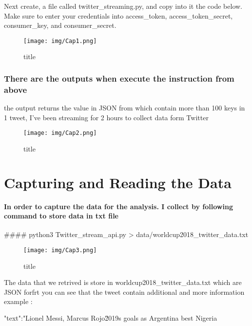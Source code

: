 \documentclass[11pt]{article}
\makeatletter
\def\maxwidth{\ifdim\Gin@nat@width>\linewidth\linewidth
    \else\Gin@nat@width\fi}
\let\Oldincludegraphics\includegraphics
\renewcommand{\includegraphics}[1]{\Oldincludegraphics[width=.8\maxwidth]{#1}}
\makeatother
\begin{document}
Next create, a file called twitter\_streaming.py, and copy into it the
code below. Make sure to enter your credentials into access\_token,
access\_token\_secret, consumer\_key, and consumer\_secret.

    \begin{figure}
\centering
\texttt{[image: img/Cap1.png]}
\caption{title}
\end{figure}

    \subsubsection{There are the outputs when execute the instruction from
above}\label{there-are-the-outputs-when-execute-the-instruction-from-above}

the output returns the value in JSON from which contain more than 100
keys in 1 tweet, I've been streaming for 2 hours to collect data form
Twitter

    \begin{figure}
\centering
\texttt{[image: img/Cap2.png]}
\caption{title}
\end{figure}

    \section{Capturing and Reading the
Data}\label{capturing-and-reading-the-data}

    \paragraph{In order to capture the data for the analysis. I collect by
following command to store data in txt
file}\label{in-order-to-capture-the-data-for-the-analysis.-i-collect-by-following-command-to-store-data-in-txt-file}

    \#\#\#\# {python3} Twitter\_stream\_api.py \textgreater{}
data/worldcup2018\_twitter\_data.txt

    \begin{figure}
\centering
\texttt{[image: img/Cap3.png]}
\caption{title}
\end{figure}

    The data that we retrived is store in worldcup2018\_twitter\_data.txt
which are JSON forfrt you can see that the tweet contain additional and
more information example :

{"text"}:"Lionel Messi, Marcus Rojo\u2019s goals as Argentina best
Nigeria
\end{document}
